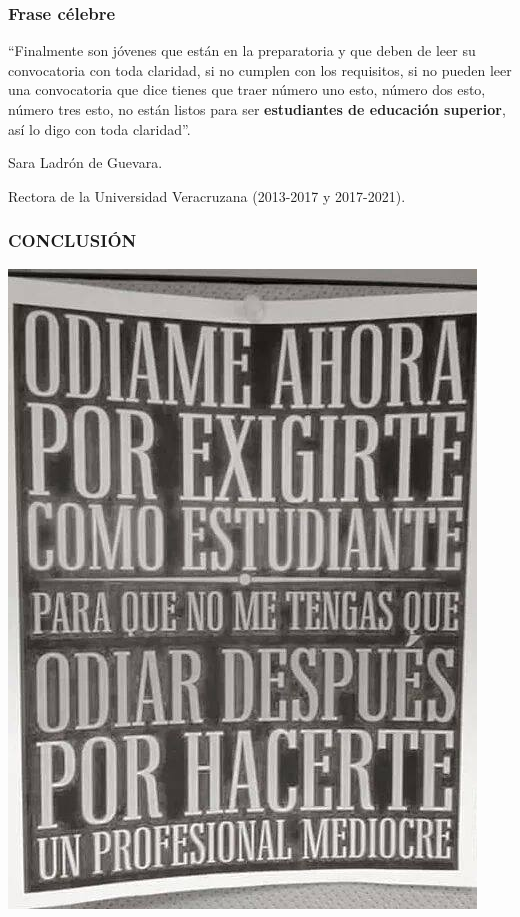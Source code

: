 \documentclass[aspectratio=169]{beamer}
\begin{document}
\begin{frame}
\frametitle{Frase célebre}
``Finalmente son jóvenes que están en la preparatoria y que deben de leer su convocatoria con toda claridad, si no cumplen con los requisitos, si no pueden leer una convocatoria que dice tienes que traer número uno esto, número dos esto, número tres esto, no están listos para ser \textbf{estudiantes de educación superior}, así lo digo con toda claridad''.

Sara Ladrón de Guevara.

Rectora de la Universidad Veracruzana (2013-2017 y 2017-2021).

\end{frame}




\begin{frame}
\frametitle{CONCLUSIÓN}
\begin{center}
\includegraphics[scale=0.31]{UNO}
\end{center}
\end{frame}
\end{document}
